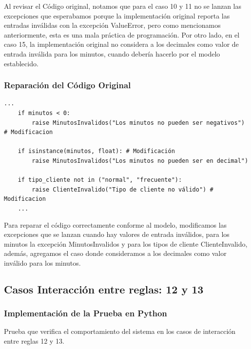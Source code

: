 \documentclass[11pt,letterpaper]{article}
\begin{document}
\vspace{\baselineskip}

Al revisar el Código original, notamos que para el caso 10 y 11 no se lanzan las excepciones que esperabamos porque la implementación original reporta las entradas inválidas con la excepción ValueError, pero como mencionamos anteriormente, esta es una mala práctica de programación. Por otro lado, en el caso 15, la implementación original no considera a los decimales como valor de entrada inválida para los minutos, cuando debería hacerlo por el modelo establecido.
\subsubsection{Reparación del Código Original}
\label{sec:org2face2b}


\begin{lstlisting}[style=practica]
    ...
    if minutos < 0:
        raise MinutosInvalidos("Los minutos no pueden ser negativos") # Modificacion

    if isinstance(minutos, float): # Modificación
        raise MinutosInvalidos("Los minutos no pueden ser en decimal")
        
    if tipo_cliente not in ("normal", "frecuente"):
        raise ClienteInvalido("Tipo de cliente no válido") # Modificacion
    ...
\end{lstlisting}

Para reparar el código correctamente conforme al modelo, modificamos las excepciones que se lanzan cuando hay valores de entrada inválidos, para los minutos la excepción MinutosInvalidos y para los tipos de cliente ClienteInvalido, además, agregamos el caso donde consideramos a los decimales como valor inválido para los minutos.
\subsection{Casos Interacción entre reglas: 12 y 13}
\label{sec:org9b170e1}

\subsubsection{Implementación de la Prueba en Python}
\label{sec:org6d6b56f}

Prueba que verifica el comportamiento del sistema en los casos de interacción entre reglas 12 y 13.

\vspace{\baselineskip}
\end{document}
